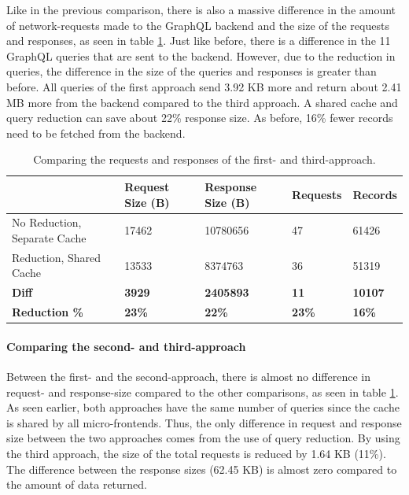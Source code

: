 \documentclass[MSE,Master,english]{twbook}%
\begin{document}
Like in the previous comparison, there is also a massive difference in the amount of network-requests made to the GraphQL backend and the size of the requests and responses, as seen in table \ref{table:results:size-comparison-first-path-no-cache-no-reduction-cache-reduction}. Just like before, there is a difference in the 11 GraphQL queries that are sent to the backend. However, due to the reduction in queries, the difference in the size of the queries and responses is greater than before. All queries of the first approach send 3.92 KB more and return about 2.41 MB more from the backend compared to the third approach. A shared cache and query reduction can save about 22\% response size. As before, 16\% fewer records need to be fetched from the backend.

\ifshowTables
\begin{table}[H]
    \begin{tabular}{|l|l|l|l|l|}
    \hline
       & Request Size (B) & Response Size (B) & Requests & Records  \\
    \hline
     No Reduction, Separate Cache & 17462 & 10780656 & 47 & 61426 \\
     \hline
     Reduction, Shared Cache & 13533 & 8374763 & 36 & 51319 \\
     \hline
     \hline
     \textbf{Diff} & \textbf{3929} & \textbf{2405893} & \textbf{11} & \textbf{10107} \\
     \hline
    \textbf{Reduction \%} & \textbf{23\%} & \textbf{22\%} & \textbf{23\%} & \textbf{16\%} \\
     \hline
    \end{tabular}
    \caption{Comparing the requests and responses of the first- and third-approach.}
    \label{table:results:size-comparison-first-path-no-cache-no-reduction-cache-reduction}
\end{table}
\fi

\paragraph{Comparing the second- and third-approach}

Between the first- and the second-approach, there is almost no difference in request- and response-size compared to the other comparisons, as seen in table \ref{table:results:size-comparison-first-path-no-cache-no-reduction-cache-reduction}. As seen earlier, both approaches have the same number of queries since the cache is shared by all micro-frontends. Thus, the only difference in request and response size between the two approaches comes from the use of query reduction. By using the third approach, the size of the total requests is reduced by 1.64 KB (11\%). The difference between the response sizes (62.45 KB) is almost zero compared to the amount of data returned.
\end{document}
